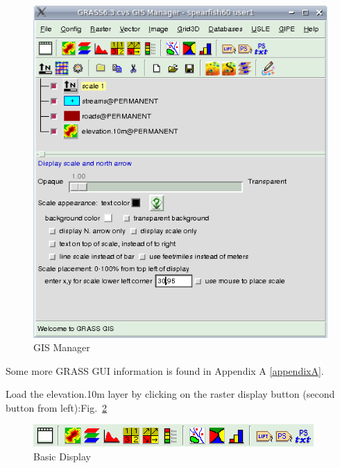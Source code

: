\begin{figure}[htbp]
   \centering
   \includegraphics[scale=0.35]{grass002.png}
   \caption{GIS Manager}
   \label{fig:grass002}
\end{figure}

Some more GRASS GUI information is found in Appendix A \ref{appendixA}.

Load the elevation.10m layer by clicking on the raster display button
(second button from left):Fig.~\ref{fig:grass003}

\begin{figure}[htbp]
   \centering
   \includegraphics[scale=0.5]{grass003.png}
   \caption{Basic Display}
   \label{fig:grass003}
\end{figure}

